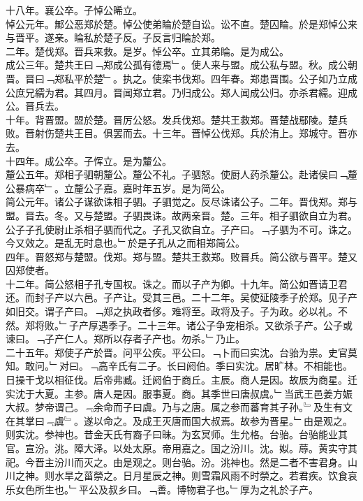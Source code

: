 \documentclass{zhvt-classic}
\begin{document}
\hspace*{2em}十八年。襄公卒。子悼公晞立。\\
\hspace*{2em}悼公元年。鄦公恶郑於楚。悼公使弟睔於楚自讼。讼不直。楚囚睔。於是郑悼公来与晋平。遂亲。睔私於楚子反。子反言归睔於郑。\\
\hspace*{2em}二年。楚伐郑。晋兵来救。是岁。悼公卒。立其弟睔。是为成公。\\
\hspace*{2em}成公三年。楚共王曰﹁郑成公孤有德焉﹂。使人来与盟。成公私与盟。秋。成公朝晋。晋曰﹁郑私平於楚﹂。执之。使栾书伐郑。四年春。郑患晋围。公子如乃立成公庶兄繻为君。其四月。晋闻郑立君。乃归成公。郑人闻成公归。亦杀君繻。迎成公。晋兵去。\\
\hspace*{2em}十年。背晋盟。盟於楚。晋厉公怒。发兵伐郑。楚共王救郑。晋楚战鄢陵。楚兵败。晋射伤楚共王目。俱罢而去。十三年。晋悼公伐郑。兵於洧上。郑城守。晋亦去。\\
\hspace*{2em}十四年。成公卒。子恽立。是为釐公。\\
\hspace*{2em}釐公五年。郑相子驷朝釐公。釐公不礼。子驷怒。使厨人药杀釐公。赴诸侯曰﹁釐公暴病卒﹂。立釐公子嘉。嘉时年五岁。是为简公。\\
\hspace*{2em}简公元年。诸公子谋欲诛相子驷。子驷觉之。反尽诛诸公子。二年。晋伐郑。郑与盟。晋去。冬。又与楚盟。子驷畏诛。故两亲晋。楚。三年。相子驷欲自立为君。公子子孔使尉止杀相子驷而代之。子孔又欲自立。子产曰。﹁子驷为不可。诛之。今又效之。是乱无时息也。﹂於是子孔从之而相郑简公。\\
\hspace*{2em}四年。晋怒郑与楚盟。伐郑。郑与盟。楚共王救郑。败晋兵。简公欲与晋平。楚又囚郑使者。\\
\hspace*{2em}十二年。简公怒相子孔专国权。诛之。而以子产为卿。十九年。简公如晋请卫君还。而封子产以六邑。子产让。受其三邑。二十二年。吴使延陵季子於郑。见子产如旧交。谓子产曰。﹁郑之执政者侈。难将至。政将及子。子为政。必以礼。不然。郑将败。﹂子产厚遇季子。二十三年。诸公子争宠相杀。又欲杀子产。公子或谏曰。﹁子产仁人。郑所以存者子产也。勿杀。﹂乃止。\\
\hspace*{2em}二十五年。郑使子产於晋。问平公疾。平公曰。﹁卜而曰实沈。台骀为祟。史官莫知。敢问。﹂对曰。﹁高辛氏有二子。长曰阏伯。季曰实沈。居旷林。不相能也。日操干戈以相征伐。后帝弗臧。迁阏伯于商丘。主辰。商人是因。故辰为商星。迁实沈于大夏。主参。唐人是因。服事夏。商。其季世曰唐叔虞。﹂当武王邑姜方娠大叔。梦帝谓己。﹃余命而子曰虞。乃与之唐。属之参而蕃育其子孙。﹄及生有文在其掌曰﹃虞﹄。遂以命之。及成王灭唐而国大叔焉。故参为晋星。﹂由是观之。则实沈。参神也。昔金天氏有裔子曰昧。为玄冥师。生允格。台骀。台骀能业其官。宣汾。洮。障大泽。以处太原。帝用嘉之。国之汾川。沈。姒。蓐。黄实守其祀。今晋主汾川而灭之。由是观之。则台骀。汾。洮神也。然是二者不害君身。山川之神。则水旱之菑禜之。日月星辰之神。则雪霜风雨不时禜之。若君疾。饮食哀乐女色所生也。﹂平公及叔乡曰。﹁善。博物君子也。﹂厚为之礼於子产。\\
\end{document}
